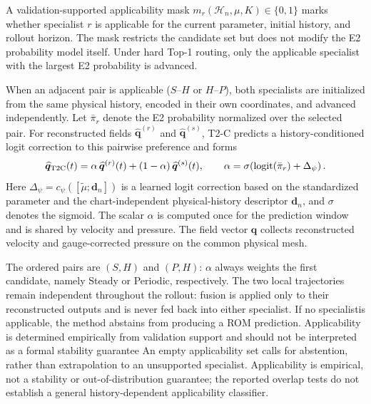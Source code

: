 \documentclass{article}
\providecommand{\DIFaddtex}[1]{{\protect\color{blue} \sf #1}} %
\providecommand{\DIFdeltex}[1]{{\protect\color{red} \scriptsize #1}} %
\providecommand{\DIFaddbegin}{} %
\providecommand{\DIFaddend}{} %
\providecommand{\DIFdelbegin}{} %
\providecommand{\DIFdelend}{} %
\providecommand{\DIFadd}[1]{\texorpdfstring{\DIFaddtex{#1}}{#1}} %
\providecommand{\DIFdel}[1]{\texorpdfstring{\DIFdeltex{#1}}{}} %
\providecommand{\DIFscaledelfig}{0.5}
\newlength{\DIFdelgraphicswidth} %
\newlength{\DIFdelgraphicsheight} %
\providecommand{\DIFaddincludegraphics}[2][]{{\color{blue}\fbox{\DIFOincludegraphics[#1]{#2}}}} %
\providecommand{\DIFdelincludegraphics}[2][]{%
\sbox{\DIFdelgraphicsbox}{\DIFOincludegraphics[#1]{#2}}%
\settoboxwidth{\DIFdelgraphicswidth}{\DIFdelgraphicsbox} %
\settoboxtotalheight{\DIFdelgraphicsheight}{\DIFdelgraphicsbox} %
\scalebox{\DIFscaledelfig}{%
\parbox[b]{\DIFdelgraphicswidth}{\usebox{\DIFdelgraphicsbox}\\[-\baselineskip] \rule{\DIFdelgraphicswidth}{0em}}\llap{\resizebox{\DIFdelgraphicswidth}{\DIFdelgraphicsheight}{%
\setlength{\unitlength}{\DIFdelgraphicswidth}%
\begin{picture}(1,1)%
\thicklines\linethickness{2pt} %
{\color[rgb]{1,0,0}\put(0,0){\framebox(1,1){}}}%
{\color[rgb]{1,0,0}\put(0,0){\line( 1,1){1}}}%
{\color[rgb]{1,0,0}\put(0,1){\line(1,-1){1}}}%
\end{picture}%
}\hspace*{3pt}}} %
} %
\DeclareRobustCommand{\DIFaddbegin}{\DIFOaddbegin \let\includegraphics\DIFaddincludegraphics} %
\DeclareRobustCommand{\DIFaddend}{\DIFOaddend \let\includegraphics\DIFOincludegraphics} %
\DeclareRobustCommand{\DIFdelbegin}{\DIFOdelbegin \let\includegraphics\DIFdelincludegraphics} %
\DeclareRobustCommand{\DIFdelend}{\DIFOaddend \let\includegraphics\DIFOincludegraphics} %
\begin{document}
A validation-supported applicability mask $m_r(\mathcal H_n,\mu,K)\in\{0,1\}$ marks whether specialist $r$ is applicable for the current parameter, initial history, and rollout horizon. The mask restricts the candidate set but does not modify the E2 probability
model itself. Under hard Top-1 routing, only the applicable specialist with the largest E2 probability is advanced.

When an adjacent pair is applicable ($S$--$H$ or $H$--$P$), both specialists are initialized from the same physical history, encoded in
their own coordinates, and advanced independently. Let $\bar\pi_r$ denote the E2 probability normalized over the selected pair. For reconstructed fields $\widehat{\bm q}^{(r)}$ and $\widehat{\bm q}^{(s)}$, T2-C predicts a history-conditioned logit correction to this pairwise preference and forms
\begin{equation}
  \widehat{\bm q}_{\rm T2C}(t)
  =\alpha\,\widehat{\bm q}^{(r)}(t)
  +(1-\alpha)\,\widehat{\bm q}^{(s)}(t),
  \qquad
  \alpha=
  \sigma\!\left(
  \operatorname{logit}(\bar\pi_r)+\Delta_\psi
  \right).
  \label{eq:main_t2c}
\end{equation}
Here $\Delta_\psi=c_\psi([\widetilde\mu;\bm d_n])$ is a learned logit correction based on the standardized parameter and the chart-independent physical-history descriptor $\bm d_n$, and $\sigma$ denotes the sigmoid. The scalar $\alpha$ is computed once for the prediction window and is shared by velocity and pressure. The field vector $\bm q$ collects reconstructed velocity and gauge-corrected pressure on the common physical mesh.

The \DIFaddbegin \DIFadd{ordered pairs are $(S,H)$ and $(P,H)$: $\alpha$ always weights the first candidate, namely Steady or Periodic, respectively. The }\DIFaddend two local trajectories remain independent throughout the rollout: fusion is applied only to their reconstructed outputs and is never fed back into either specialist. \DIFdelbegin \DIFdel{If no specialistis applicable, the method abstains from producing a ROM prediction.
Applicability is determined empirically from validation support and should not be interpreted as a formal stability guarantee}\DIFdelend \DIFaddbegin \DIFadd{An empty applicability set calls for abstention, rather than extrapolation to an unsupported specialist. Applicability is empirical, not a stability or out-of-distribution guarantee; the reported overlap tests do not establish a general history-dependent applicability classifier.
}
\end{document}

